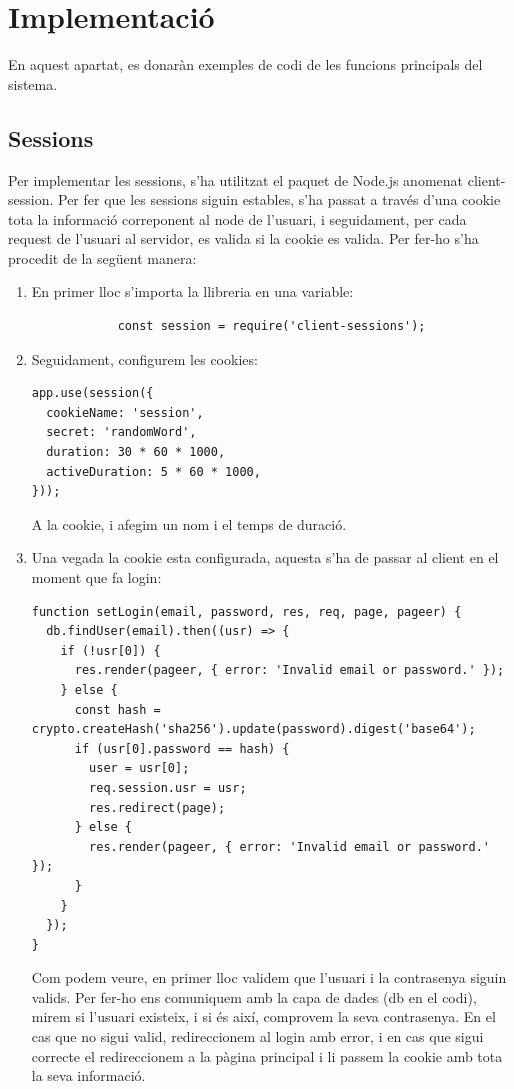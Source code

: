 \documentclass[11pt,catalan,listoffigures,listoftables]{tfgetsinf}
\begin{document}
\section{Implementació}
En aquest apartat, es donaràn exemples de codi de les funcions principals del sistema.

\subsection{Sessions}
Per implementar les sessions, s'ha utilitzat el paquet de Node.js anomenat client-session. Per fer que les sessions siguin estables, s'ha passat a través d'una cookie tota la informació correponent al node de l'usuari, i seguidament, per cada request de l'usuari al servidor, es valida si la cookie es valida. Per fer-ho s'ha procedit de la següent manera:
\begin{enumerate}
	\item En primer lloc s'importa la llibreria en una variable:
		\begin{lstlisting}
			const session = require('client-sessions');
		\end{lstlisting}
	\item Seguidament, configurem les cookies:
\begin{lstlisting}
app.use(session({
  cookieName: 'session',
  secret: 'randomWord',
  duration: 30 * 60 * 1000,
  activeDuration: 5 * 60 * 1000,
}));	
\end{lstlisting}
A la cookie, i afegim un nom i el temps de duració.
\item Una vegada la cookie esta configurada, aquesta s'ha de passar al client en el moment que fa login:
\begin{lstlisting}
function setLogin(email, password, res, req, page, pageer) {
  db.findUser(email).then((usr) => {
    if (!usr[0]) {
      res.render(pageer, { error: 'Invalid email or password.' });
    } else {
      const hash = crypto.createHash('sha256').update(password).digest('base64');
      if (usr[0].password == hash) {
        user = usr[0];
        req.session.usr = usr;
        res.redirect(page);
      } else {
        res.render(pageer, { error: 'Invalid email or password.' });
      }
    }
  });
}
\end{lstlisting}
Com podem veure, en primer lloc validem que l'usuari i la contrasenya siguin valids. Per fer-ho ens comuniquem amb la capa de dades (db en el codi), mirem si l'usuari existeix, i si és així, comprovem la seva contrasenya. En el cas que no sigui valid, redireccionem al login amb error, i en cas que sigui correcte el redireccionem a la pàgina principal i li passem la cookie amb tota la seva informació.

\end{enumerate}
\end{document}
